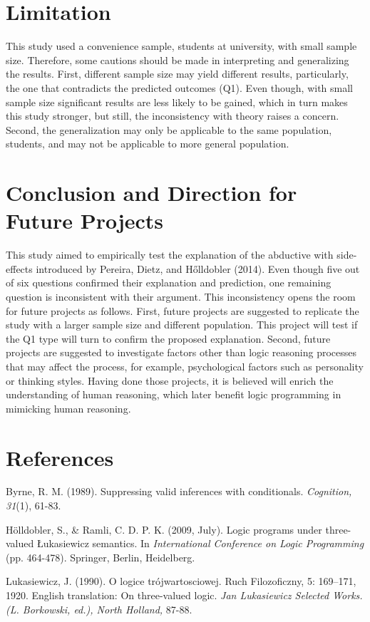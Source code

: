 \documentclass[]{interact}
\theoremstyle{plain}%
\theoremstyle{definition}
\theoremstyle{remark}
\begin{document}
\section{Limitation}
This study used a convenience sample, students at university, with small sample size. Therefore, some cautions should be made in interpreting and generalizing the results. First, different sample size may yield different results, particularly, the one that contradicts the predicted outcomes (Q1). Even though, with small sample size significant results are less likely to be gained, which in turn makes this study stronger, but still, the inconsistency with theory raises a concern. Second, the generalization may only be applicable to the same population, students, and may not be applicable to more general population.

\section{Conclusion and Direction for Future Projects}
This study aimed to empirically test the explanation of the abductive with side-effects introduced by Pereira, Dietz, and Hőlldobler (2014). Even though five out of six questions confirmed their explanation and prediction, one remaining question is inconsistent with their argument. This inconsistency opens the room for future projects as follows. First, future projects are suggested to replicate the study with a larger sample size and different population. This project will test if the Q1 type will turn to confirm the proposed explanation. Second, future projects are suggested to investigate factors other than logic reasoning processes that may affect the process, for example, psychological factors such as personality or thinking styles. Having done those projects, it is believed will enrich the understanding of human reasoning, which later benefit logic programming in mimicking human reasoning.

\section{References}
Byrne, R. M. (1989). Suppressing valid inferences with conditionals. \emph{Cognition, 31}(1), 61-83.

Hölldobler, S., \& Ramli, C. D. P. K. (2009, July). Logic programs under three-valued Łukasiewicz semantics. In \emph{International Conference on Logic Programming} (pp. 464-478). Springer, Berlin, Heidelberg.

Lukasiewicz, J. (1990). O logice trójwartosciowej. Ruch Filozoficzny, 5: 169–171, 1920. English translation: On three-valued logic. \emph{Jan Lukasiewicz Selected Works.(L. Borkowski, ed.), North Holland,} 87-88.
\end{document}
